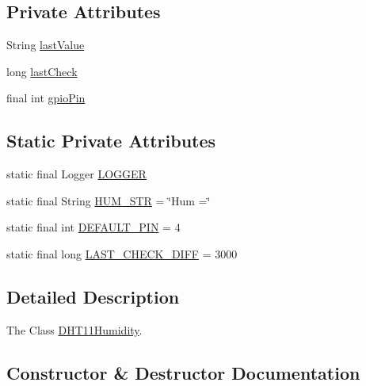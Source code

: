 \subsection*{Private Attributes}
\begin{DoxyCompactItemize}
\item 
String \hyperlink{classcom_1_1libsensorj_1_1concretesensor_1_1DHT11Humidity_a88a634746e0b70f8845fc8cddcab0cd9}{last\+Value}
\item 
long \hyperlink{classcom_1_1libsensorj_1_1concretesensor_1_1DHT11Humidity_ab366586f1db5139d46a33d8404610618}{last\+Check}
\item 
final int \hyperlink{classcom_1_1libsensorj_1_1concretesensor_1_1DHT11Humidity_af27f27bf207dc6ef458fcf276657ac87}{gpio\+Pin}
\end{DoxyCompactItemize}
\subsection*{Static Private Attributes}
\begin{DoxyCompactItemize}
\item 
static final Logger \hyperlink{classcom_1_1libsensorj_1_1concretesensor_1_1DHT11Humidity_a80655575ba16db014b7a1a797e030eae}{L\+O\+G\+G\+E\+R}
\item 
static final String \hyperlink{classcom_1_1libsensorj_1_1concretesensor_1_1DHT11Humidity_ae8dbe4074dc20cff07fe6b80c419e94c}{H\+U\+M\+\_\+\+S\+T\+R} = \char`\"{}Hum =\char`\"{}
\item 
static final int \hyperlink{classcom_1_1libsensorj_1_1concretesensor_1_1DHT11Humidity_a3c903f57ebd6754e89fef43ff955d8f7}{D\+E\+F\+A\+U\+L\+T\+\_\+\+P\+I\+N} = 4
\item 
static final long \hyperlink{classcom_1_1libsensorj_1_1concretesensor_1_1DHT11Humidity_abe7a38f0bad502d03d31fa7da4025dbf}{L\+A\+S\+T\+\_\+\+C\+H\+E\+C\+K\+\_\+\+D\+I\+F\+F} = 3000
\end{DoxyCompactItemize}


\subsection{Detailed Description}
The Class \hyperlink{classcom_1_1libsensorj_1_1concretesensor_1_1DHT11Humidity}{D\+H\+T11\+Humidity}. 

\subsection{Constructor \& Destructor Documentation}
\hypertarget{classcom_1_1libsensorj_1_1concretesensor_1_1DHT11Humidity_a86e81ac52b8c579b5025c33a8a64c360}{}
